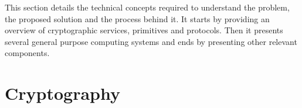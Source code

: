 \cleardoublepage
\label{chap:background}

This section details the technical concepts required to understand the problem, the proposed solution and the process behind it. It starts by providing an overview of cryptographic services, primitives and protocols. Then it presents several general purpose computing systems and ends by presenting other relevant components.

\section{Cryptography}\label{chap:background:crypto}


